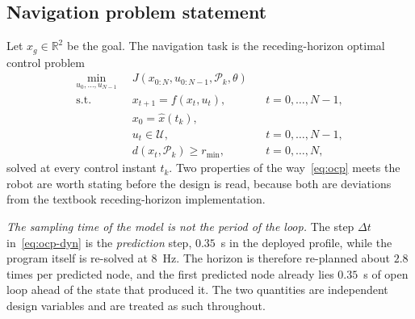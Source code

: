 \documentclass[11pt,a4paper]{article}
\newcommand{\R}{\mathbb{R}}
\begin{document}


\subsection{Navigation problem statement}
\label{sec:statement}

Let $x_g\in\R^2$ be the goal. The navigation task is the receding-horizon optimal control problem
\begin{subequations}
\label{eq:ocp}
\begin{align}
  \min_{u_0,\dots,u_{N-1}}\;\; & J\!\left(x_{0:N},u_{0:N-1},\mathcal{P}_k,\theta\right) \label{eq:ocp-cost}\\
  \text{s.t.}\quad & x_{t+1}=f(x_t,u_t), && t=0,\dots,N-1, \label{eq:ocp-dyn}\\
                   & x_0 = \hat x(t_k), \label{eq:ocp-init}\\
                   & u_t\in\mathcal{U}, && t=0,\dots,N-1, \label{eq:ocp-input}\\
                   & d\!\left(x_t,\mathcal{P}_k\right)\ge r_{\min}, && t=0,\dots,N, \label{eq:ocp-obs}
\end{align}
\end{subequations}
solved at every control instant $t_k$. Two properties of the way~\eqref{eq:ocp} meets the robot are worth
stating before the design is read, because both are deviations from the textbook receding-horizon
implementation.

\emph{The sampling time of the model is not the period of the loop.} The step $\Delta t$
in~\eqref{eq:ocp-dyn} is the \emph{prediction} step, $0.35$~s in the deployed profile, while the program
itself is re-solved at $8$~Hz. The horizon is therefore re-planned about $2.8$ times per predicted node, and
the first predicted node already lies $0.35$~s of open loop ahead of the state that produced it. The two
quantities are independent design variables and are treated as such throughout.
\end{document}
